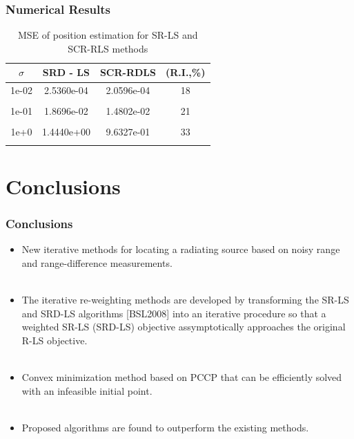 \documentclass [t] {beamer} %
\begin{document}
\begin{frame} %
\frametitle{Numerical Results}
\begin{table}
\phantom{m}
\caption{MSE of position estimation for SR-LS and SCR-RLS methods}
\begin{tabular}{||c||c|c|c||} 
\hhline{|t:====:t|} 
$\sigma$ & SRD - LS & SCR-RDLS & (R.I.,\%)  \\ \hline
1e-02&	2.5360e-04 &  2.0596e-04 &  18 \\ &&&\\
1e-01&	1.8696e-02 & 1.4802e-02 &   21 \\ &&&\\
1e+0&	1.4440e+00 &  9.6327e-01 &   33  \\ %
\hhline{|b:====:b|} 
\end{tabular}
\end{table}
\end{frame}

%
%
\section{Conclusions} 

\begin{frame}
\frametitle{Conclusions} 
\phantom{m}
\begin{itemize}
\item
New iterative methods for locating a radiating source based on noisy range and range-difference measurements.
\\~\\
\item
The iterative re-weighting methods are developed by transforming the SR-LS and SRD-LS algorithms [BSL2008] into an iterative procedure so that a weighted SR-LS (SRD-LS) objective assymptotically
approaches the original R-LS objective.
\\~\\
\item
Convex minimization method based on PCCP that can be efficiently solved with an infeasible initial point.
\\~\\
\item
Proposed algorithms are found to outperform the existing methods.
\end{itemize}
\end{frame}
\end{document}
